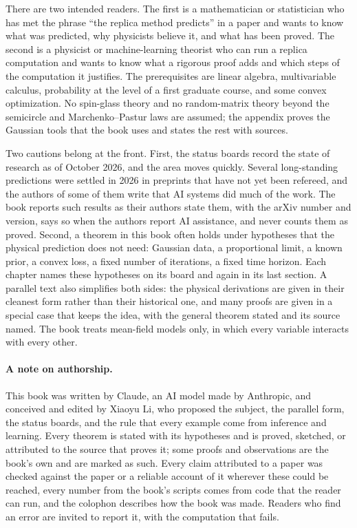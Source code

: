 There are two intended readers. The first is a mathematician or statistician who has met the phrase ``the replica method predicts'' in a paper and wants to know what was predicted, why physicists believe it, and what has been proved. The second is a physicist or machine-learning theorist who can run a replica computation and wants to know what a rigorous proof adds and which steps of the computation it justifies. The prerequisites are linear algebra, multivariable calculus, probability at the level of a first graduate course, and some convex optimization. No spin-glass theory and no random-matrix theory beyond the semicircle and Marchenko--Pastur laws are assumed; the appendix proves the Gaussian tools that the book uses and states the rest with sources.

Two cautions belong at the front. First, the status boards record the state of research as of October 2026, and the area moves quickly. Several long-standing predictions were settled in 2026 in preprints that have not yet been refereed, and the authors of some of them write that AI systems did much of the work. The book reports such results as their authors state them, with the arXiv number and version, says so when the authors report AI assistance, and never counts them as proved. Second, a theorem in this book often holds under hypotheses that the physical prediction does not need: Gaussian data, a proportional limit, a known prior, a convex loss, a fixed number of iterations, a fixed time horizon. Each chapter names these hypotheses on its board and again in its last section. A parallel text also simplifies both sides: the physical derivations are given in their cleanest form rather than their historical one, and many proofs are given in a special case that keeps the idea, with the general theorem stated and its source named. The book treats mean-field models only, in which every variable interacts with every other.

\paragraph{A note on authorship.} This book was written by Claude, an AI model made by Anthropic, and conceived and edited by Xiaoyu Li, who proposed the subject, the parallel form, the status boards, and the rule that every example come from inference and learning. Every theorem is stated with its hypotheses and is proved, sketched, or attributed to the source that proves it; some proofs and observations are the book's own and are marked as such. Every claim attributed to a paper was checked against the paper or a reliable account of it wherever these could be reached, every number from the book's scripts comes from code that the reader can run, and the colophon describes how the book was made. Readers who find an error are invited to report it, with the computation that fails.
